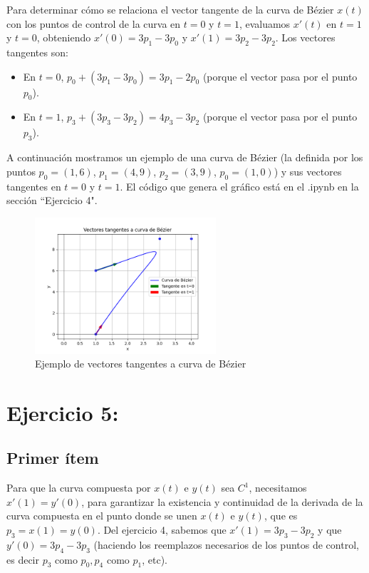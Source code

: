 \documentclass{article}
\begin{document}
Para determinar cómo se relaciona el vector tangente de la curva de Bézier $x(t)$ con los puntos de control de la curva en $t=0$ y $t=1$, evaluamos $x'(t)$ en $t = 1$ y $t = 0$, obteniendo $x'(0) = 3p_1-3p_0$ y $x'(1) = 3p_2-3p_2$. Los vectores tangentes son:
\begin{itemize}
    \item En $t = 0$, $p_0 + (3p_1-3p_0) = 3p_1-2p_0$ (porque el vector pasa por el punto $p_0$).
    \item En $t = 1$, $p_3 +  (3p_3-3p_2) =  4p_3-3p_2$ (porque el vector pasa por el punto $p_3$).
\end{itemize}

A continuación mostramos un ejemplo de una curva de Bézier (la definida por los puntos $p_0 = (1, 6)$, $p_1 = (4, 9)$, $p_2 = (3, 9)$, $p_0 = (1, 0)$) y sus vectores tangentes en $t = 0$ y $t = 1$. El código que genera el gráfico está en el .ipynb en la sección ``Ejercicio 4".

\begin{figure}[H]
    \centering
    \includegraphics[width=0.6\textwidth]{imagenes/ej4.png}
    \caption{Ejemplo de vectores tangentes a curva de Bézier}
    \label{fig:ejemplo}
\end{figure}

\section*{Ejercicio 5:}
\subsection*{Primer ítem}
Para que la curva compuesta por $x(t)$ e $y(t)$ sea $C^1$, necesitamos $x'(1) = y'(0)$, para garantizar la existencia y continuidad de la derivada de la curva compuesta en el punto donde se unen $x(t)$ e $y(t)$, que es $p_3 = x(1) = y(0)$. Del ejercicio 4, sabemos que $x'(1) = 3p_3-3p_2$ y que $y'(0) = 3p_4-3p_3$ (haciendo los reemplazos necesarios de los puntos de control, es decir $p_3$ como $p_0, p_4$ como $p_1$, etc).
\end{document}
